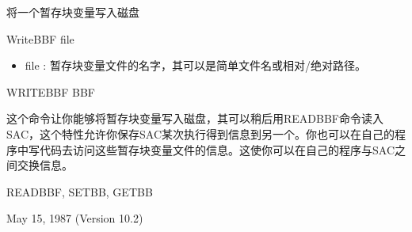 \label{cmd:writebbf}

将一个暂存块变量写入磁盘

WriteBBF {file}

\begin{itemize}
\item file : 暂存块变量文件的名字，其可以是简单文件名或相对/绝对路径。
\end{itemize}

WRITEBBF BBF

这个命令让你能够将暂存块变量写入磁盘，其可以稍后用READBBF命令读入SAC，这个特性允许你保存SAC某次执行得到信息到另一个。你也可以在自己的程序中写代码去访问这些暂存块变量文件的信息。这使你可以在自己的程序与SAC之间交换信息。

READBBF, SETBB, GETBB

May 15, 1987 (Version 10.2)

